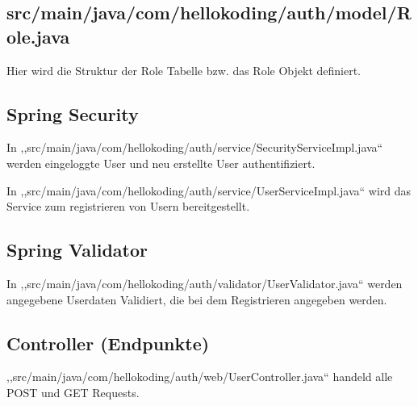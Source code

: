 \subsection{src/main/java/com/hellokoding/auth/model/Role.java}
Hier wird die Struktur der Role Tabelle bzw. das Role Objekt definiert.

\subsection{Spring Security}
In ,,src/main/java/com/hellokoding/auth/service/SecurityServiceImpl.java`` werden eingeloggte User und neu erstellte User authentifiziert.

In ,,src/main/java/com/hellokoding/auth/service/UserServiceImpl.java`` wird das Service zum registrieren von Usern bereitgestellt.

\subsection{Spring Validator}  
In ,,src/main/java/com/hellokoding/auth/validator/UserValidator.java`` werden angegebene Userdaten Validiert, die bei dem Registrieren angegeben werden.

\subsection{Controller (Endpunkte)}
,,src/main/java/com/hellokoding/auth/web/UserController.java`` handeld alle POST und GET Requests. 


